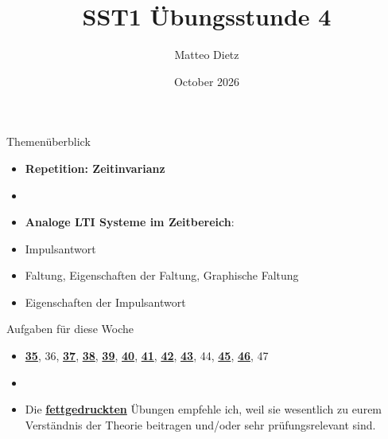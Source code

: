 \documentclass[14pt, aspectratio=169, handout]{beamer}
\title{SST1 Übungsstunde 4}
\author{Matteo Dietz}
\date{October 2026}
\begin{document}
\maketitle

\begin{frame}{Themenüberblick}
    \begin{itemize}
        \item \textbf{Repetition: Zeitinvarianz}
        \item[] 
        \item \textbf{Analoge LTI Systeme im Zeitbereich}:
        \item[] Impulsantwort
        \item[] Faltung, Eigenschaften der Faltung, Graphische Faltung
        \item[] Eigenschaften der Impulsantwort
    \end{itemize}
\end{frame}

\begin{frame}{Aufgaben für diese Woche}
    \begin{itemize}
        \item[] \underline{\textbf{35}}, 36, \underline{\textbf{37}}, \underline{\textbf{38}}, \underline{\textbf{39}}, \underline{\textbf{40}}, \underline{\textbf{41}}, \underline{\textbf{42}}, \underline{\textbf{43}}, 44, \underline{\textbf{45}}, \underline{\textbf{46}}, 47
        \item[] 
        \item[] Die \underline{\textbf{fettgedruckten}} Übungen empfehle ich, weil sie wesentlich zu eurem Verständnis der Theorie beitragen und/oder sehr prüfungsrelevant sind.
    \end{itemize}
\end{frame}


\end{document}
